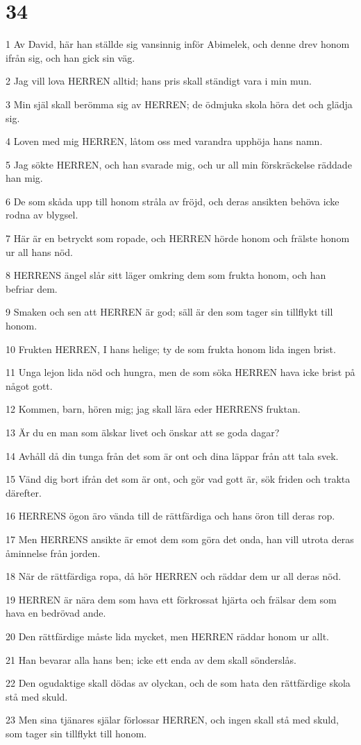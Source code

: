 \chapter{34}

\par 1 Av David, här han ställde sig vansinnig inför Abimelek, och denne drev honom ifrån sig, och han gick sin väg.
\par 2 Jag vill lova HERREN alltid; hans pris skall ständigt vara i min mun.
\par 3 Min själ skall berömma sig av HERREN; de ödmjuka skola höra det och glädja sig.
\par 4 Loven med mig HERREN, låtom oss med varandra upphöja hans namn.
\par 5 Jag sökte HERREN, och han svarade mig, och ur all min förskräckelse räddade han mig.
\par 6 De som skåda upp till honom stråla av fröjd, och deras ansikten behöva icke rodna av blygsel.
\par 7 Här är en betryckt som ropade, och HERREN hörde honom och frälste honom ur all hans nöd.
\par 8 HERRENS ängel slår sitt läger omkring dem som frukta honom, och han befriar dem.
\par 9 Smaken och sen att HERREN är god; säll är den som tager sin tillflykt till honom.
\par 10 Frukten HERREN, I hans helige; ty de som frukta honom lida ingen brist.
\par 11 Unga lejon lida nöd och hungra, men de som söka HERREN hava icke brist på något gott.
\par 12 Kommen, barn, hören mig; jag skall lära eder HERRENS fruktan.
\par 13 Är du en man som älskar livet och önskar att se goda dagar?
\par 14 Avhåll då din tunga från det som är ont och dina läppar från att tala svek.
\par 15 Vänd dig bort ifrån det som är ont, och gör vad gott är, sök friden och trakta därefter.
\par 16 HERRENS ögon äro vända till de rättfärdiga och hans öron till deras rop.
\par 17 Men HERRENS ansikte är emot dem som göra det onda, han vill utrota deras åminnelse från jorden.
\par 18 När de rättfärdiga ropa, då hör HERREN och räddar dem ur all deras nöd.
\par 19 HERREN är nära dem som hava ett förkrossat hjärta och frälsar dem som hava en bedrövad ande.
\par 20 Den rättfärdige måste lida mycket, men HERREN räddar honom ur allt.
\par 21 Han bevarar alla hans ben; icke ett enda av dem skall sönderslås.
\par 22 Den ogudaktige skall dödas av olyckan, och de som hata den rättfärdige skola stå med skuld.
\par 23 Men sina tjänares själar förlossar HERREN, och ingen skall stå med skuld, som tager sin tillflykt till honom.

